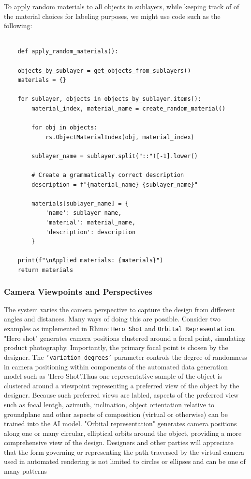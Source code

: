 \documentclass[12pt]{report}
\begin{document}
To apply random materials to all objects in sublayers, while keeping track of of the material choices for labeling purposes, we might use code such as the following:

\begin{verbatim}

    def apply_random_materials():

    objects_by_sublayer = get_objects_from_sublayers()
    materials = {}
    
    for sublayer, objects in objects_by_sublayer.items():
        material_index, material_name = create_random_material()
        
        for obj in objects:
            rs.ObjectMaterialIndex(obj, material_index)
        
        sublayer_name = sublayer.split("::")[-1].lower()
        
        # Create a grammatically correct description
        description = f"{material_name} {sublayer_name}"
        
        materials[sublayer_name] = {
            'name': sublayer_name,
            'material': material_name,
            'description': description
        }
    
    print(f"\nApplied materials: {materials}")
    return materials
        \end{verbatim}

\subsubsection{Camera Viewpoints and Perspectives}

The system varies the camera perspective to capture the design from different angles and distances. Many ways of doing this are possible. Consider two examples as implemented in Rhino: \texttt{Hero Shot} and \texttt{Orbital Representation}. "Hero shot" generates camera positions clustered around a focal point, simulating product photography. Importantly, the primary focal point is chosen by the designer. The \texttt{'variation\_degrees'} parameter controls the degree of randomness in camera positioning within components of the automated data generation model such as 'Hero Shot'.Thus one representative sample of the object is clustered around a viewpoint representing a preferred view of the object by the designer. Because such preferred views are labled, aspects of the preferred view such as focal lentgh, azimuth, inclination, object orientation relative to groundplane and other aspects of composition (virtual or otherwise) can be trained into the AI model. "Orbital representation" generates camera positions along one or many circular, elliptical  orbits around the object, providing a more comprehensive view of the design. Designers and other parties will appreciate that the form governing or representing the path traversed by the virtual camera used in automated rendering is not limited to circles or ellipses and can be one of many patterns
\end{document}
